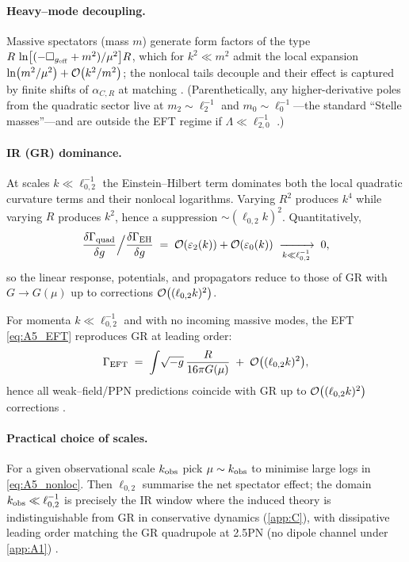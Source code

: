 \documentclass{iopjournal}
\begin{document}
\paragraph{Heavy–mode decoupling.}
Massive spectators (mass $m$) generate form factors of the type
$R\,\ln\!\big[(-\Box_{g_{\rm eff}}+m^2)/\mu^2\big]R$, which for $k^2\ll m^2$ admit the local expansion
$\ln(m^2/\mu^2)+\order{k^2/m^2}$; the nonlocal tails decouple and their effect is captured by finite shifts of $\alpha_{C,R}$ at matching \cite{Donoghue1994,ParkerToms}. (Parenthetically, any higher-derivative poles from the quadratic sector live at $m_2\sim \ell_2^{-1}$ and $m_0\sim \ell_0^{-1}$—the standard ``Stelle masses''—and are outside the EFT regime if $\Lambda\ll \ell_{2,0}^{-1}$ \cite{Stelle1977}.)

\paragraph{IR (GR) dominance.}
At scales $k\ll \ell_{0,2}^{-1}$ the Einstein–Hilbert term dominates both the local quadratic curvature terms and their nonlocal logarithms. Varying $R^2$ produces $k^4$ while varying $R$ produces $k^2$, hence a suppression $\sim(\ell_{0,2}k)^2$. Quantitatively,
\begin{equation}
\frac{\delta\Gamma_{\rm quad}}{\delta g}\Big/\frac{\delta\Gamma_{\rm EH}}{\delta g}
\;=\;\order{\varepsilon_2(k)}+\order{\varepsilon_0(k)}\;\xrightarrow[k\ll \ell_{0,2}^{-1}]{}\;0,
\label{eq:A5_ratio}
\end{equation}
so the linear response, potentials, and propagators reduce to those of GR with $G\to G(\mu)$ up to corrections $\order{(\ell_{0,2}k)^2}$.

\begin{conceptbox}[IR limit.]
For momenta $k\ll \ell_{0,2}^{-1}$ and with no incoming massive modes, the EFT \eqref{eq:A5_EFT} reproduces GR at leading order:
\[
\Gamma_{\rm EFT}\;=\;\int\!\sqrt{-g}\,\frac{R}{16\pi G(\mu)}\;+\;\order{(\ell_{0,2}k)^2},
\]
hence all weak–field/PPN predictions coincide with GR up to $\order{(\ell_{0,2}k)^2}$ corrections \cite{PoissonWill2014,Will2014LRR}.
	
\end{conceptbox}



\paragraph{Practical choice of scales.}
For a given observational scale $k_{\rm obs}$ pick $\mu\sim k_{\rm obs}$ to minimise large logs in \eqref{eq:A5_nonloc}. Then $\ell_{0,2}$ summarise the net spectator effect; the domain $k_{\rm obs}\ll \ell_{0,2}^{-1}$ is precisely the IR window where the induced theory is indistinguishable from GR in conservative dynamics (\cref{app:C}), with dissipative leading order matching the GR quadrupole at 2.5PN (no dipole channel under \cref{app:A1}) \cite{Blanchet2014LRR}.
\end{document}
